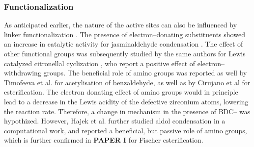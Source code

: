 \subsubsection*{Functionalization}
As anticipated earlier, the nature of the active sites can also be influenced by linker functionalization \cite{kandiah2010synthesis, kandiah2010post, kim2012discovery}. 
The presence of electron--donating substituents showed an increase in catalytic activity for jasminaldehyde condensation \cite{vermoortele2011amino}. The effect of other functional groups was subsequently studied by the same authors for Lewis catalyzed citronellal cyclization \cite{vermoortele2012electronic}, who report a positive effect of electron--withdrawing groups. The beneficial role of amino groups was reported as well by Timofeeva et al. \cite{timofeeva2014effects} for acetylisation of benzaldehyde, as well as by Cirujano et al \cite{cirujano2015zirconium, cirujano2015conversion} for esterification. The electron donating effect of amino groups would in principle lead to a decrease in the Lewis acidity of the defective zirconium atoms, lowering the reaction rate. Therefore, a change in mechanism in the presence of BDC-- was hypothized. However, Hajek et al. further studied aldol condensation in a computational work\cite{hajek2015mechanistic}, and reported a beneficial, but passive role of amino groups, which is further confirmed in \textbf{PAPER I} for Fischer esterification. 

